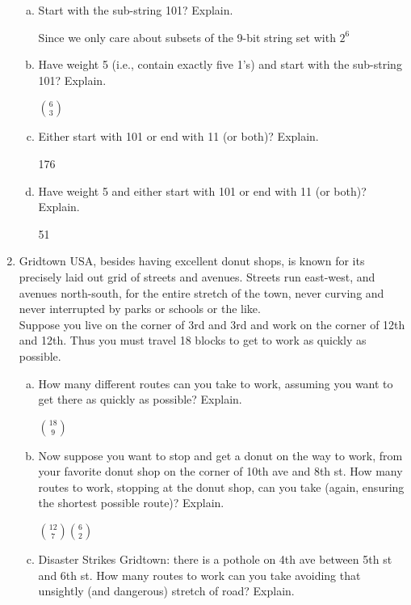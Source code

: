 \documentclass[11pt, a4paper]{article}
\newcommand\setItemNumber[1]{\setcounter{enumi}{\numexpr#1-1\relax}}
\newcommand{\forceindent}{\leavevmode{\parindent=1em\indent}}
\begin{document}
\begin{enumerate}
\begin{enumerate}[(a)]
                \item Start with the sub-string 101? Explain.

                    Since we only care about subsets of the 9-bit string set with $2^6$

                \item Have weight 5 (i.e., contain exactly five 1’s) and start with the sub-string 101? Explain.

                ${6\choose 3}$

                \item Either start with 101 or end with 11 (or both)? Explain.

                    176

                \item Have weight 5 and either start with 101 or end with 11 (or both)? Explain.

                    51

            \end{enumerate}

        \setItemNumber{11}
        \item Gridtown USA, besides having excellent donut shops, is known for its precisely laid out grid of streets and avenues. Streets run east-west, and avenues north-south, for the entire stretch of the town, never curving and never interrupted by parks or schools or the like.\\\forceindent Suppose you live on the corner of 3rd and 3rd and work on the corner of 12th and 12th. Thus you must travel 18 blocks to get to work as quickly as possible.
            \begin{enumerate}[(a)]

                \item How many different routes can you take to work, assuming you want to get there as quickly as possible? Explain.

                ${18\choose  9}$

                \item Now suppose you want to stop and get a donut on the way to work, from your favorite donut shop on the corner of 10th ave and 8th st. How many routes to work, stopping at the donut shop, can you take (again, ensuring the shortest possible route)? Explain.

                    ${12\choose 7}{6\choose 2}$
                \item Disaster Strikes Gridtown: there is a pothole on 4th ave between 5th st and 6th st. How many routes to work can you take avoiding that unsightly (and dangerous) stretch of road? Explain.


\end{enumerate}
\end{enumerate}
\end{document}
